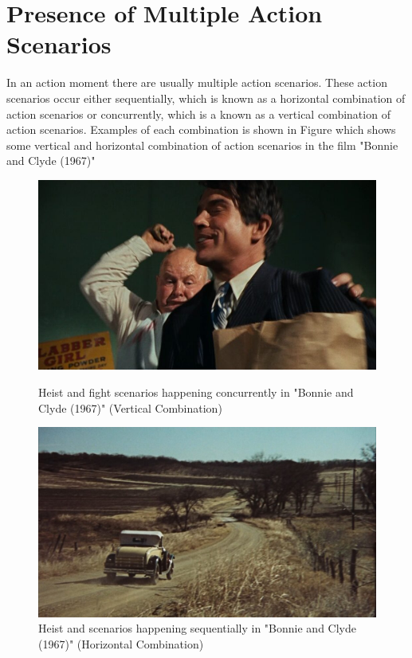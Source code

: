 \documentclass[12pt]{report}
\begin{document}
	\section{Presence of Multiple Action Scenarios}
	In an action moment there are usually multiple action scenarios. These action scenarios occur either sequentially, which is known as a horizontal combination of action scenarios or concurrently, which is a known as a vertical combination of action scenarios. Examples of each combination is shown in Figure 
	 which shows some vertical and horizontal combination of action scenarios in the film "Bonnie and Clyde (1967)"
		\begin{figure}[h]
		\centering
		\begin{minipage}{0.45\linewidth}
			\centering
			\includegraphics[width=\linewidth]{Bonnie-and-Clyde-R2-1967-768x432.jpg}
			\caption{ Heist and fight scenarios happening concurrently in "Bonnie and Clyde (1967)" (Vertical Combination) \cite{tico-romao-2024}}
			\label{fig:bonnie_and_clyde_1}
		\end{minipage}
		\hspace{0.05\linewidth}  %
		\begin{minipage}{0.45\linewidth}
			\centering
			\includegraphics[width=\linewidth]{Bonnie-and-Clyde-R4-1967-1024x576.jpg}
			\caption{Heist and scenarios happening sequentially in "Bonnie and Clyde (1967)" (Horizontal Combination) \cite{tico-romao-2024}}
			\label{fig:bonnie_and_clyde_2}
		\end{minipage}
	\end{figure}
\end{document}
